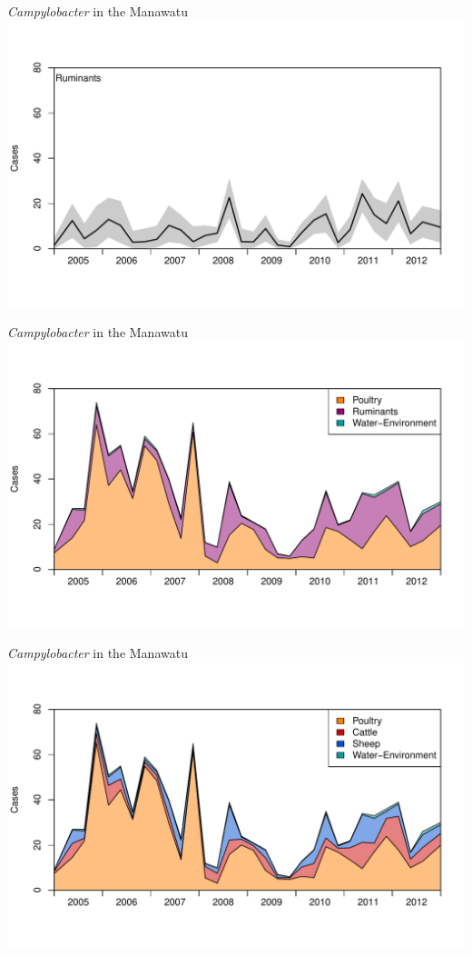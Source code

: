 \documentclass[]{beamer}
\begin{document}
\begin{frame}{\emph{Campylobacter} in the Manawatu}
\includegraphics[width=\textwidth, trim=40 0 40 0]{Pictures/island/ruminants/totals_Ruminants.pdf}
\end{frame}

\begin{frame}{\emph{Campylobacter} in the Manawatu}
\includegraphics[width=\textwidth, trim=40 0 40 0]{Pictures/island/ruminants/totals.pdf}
\end{frame}

\begin{frame}{\emph{Campylobacter} in the Manawatu}
\includegraphics[width=\textwidth, trim=40 0 40 0]{Pictures/island/totals.pdf}
\end{frame}
\end{document}
